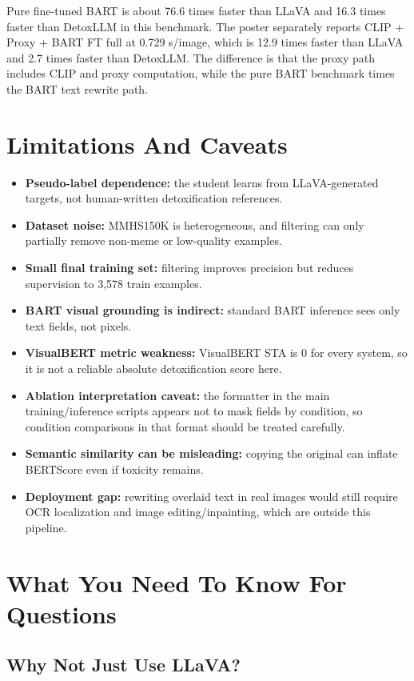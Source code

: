 \documentclass[11pt,a4paper]{article}
\newcommand{\code}[1]{\texttt{\detokenize{#1}}}
\begin{document}
Pure fine-tuned BART is about 76.6 times faster than LLaVA and 16.3 times faster than DetoxLLM in this benchmark. The poster separately reports CLIP + Proxy + BART FT full at 0.729 s/image, which is 12.9 times faster than LLaVA and 2.7 times faster than DetoxLLM. The difference is that the proxy path includes CLIP and proxy computation, while the pure BART benchmark times the BART text rewrite path.

\section{Limitations And Caveats}

\begin{itemize}
  \item \textbf{Pseudo-label dependence:} the student learns from LLaVA-generated targets, not human-written detoxification references.
  \item \textbf{Dataset noise:} MMHS150K is heterogeneous, and filtering can only partially remove non-meme or low-quality examples.
  \item \textbf{Small final training set:} filtering improves precision but reduces supervision to 3,578 train examples.
  \item \textbf{BART visual grounding is indirect:} standard BART inference sees only text fields, not pixels.
  \item \textbf{VisualBERT metric weakness:} VisualBERT STA is 0 for every system, so it is not a reliable absolute detoxification score here.
  \item \textbf{Ablation interpretation caveat:} the \code{explicit_detox} formatter in the main training/inference scripts appears not to mask fields by condition, so condition comparisons in that format should be treated carefully.
  \item \textbf{Semantic similarity can be misleading:} copying the original can inflate BERTScore even if toxicity remains.
  \item \textbf{Deployment gap:} rewriting overlaid text in real images would still require OCR localization and image editing/inpainting, which are outside this pipeline.
\end{itemize}

\section{What You Need To Know For Questions}

\subsection{Why Not Just Use LLaVA?}
\end{document}

